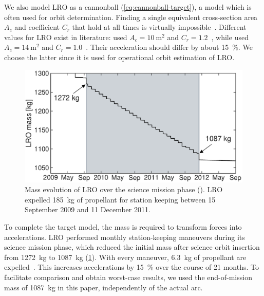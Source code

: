 We also model \gls{LRO} as a cannonball (\cref{eq:cannonball-target}), a model which is often used for orbit determination. Finding a single equivalent cross-section area $A_c$ and coefficient $C_r$ that hold at all times is virtually impossible~\cite{Vallado2013}. Different values for \gls{LRO} exist in literature: \citeauthor{Bauer2016} used $A_c = \qty{10}{\m\squared}$ and $C_r = 1.2$~\cite{Bauer2016}, while \citeauthor{Nicholson2010} used $A_c=\qty{14}{\m\squared}$ and $C_r = 1.0$~\cite{Nicholson2010}. Their acceleration should differ by about \qty{15}{\percent}. We choose the latter since it is used for operational orbit estimation of \gls{LRO}.

\begin{figure}[t]
    \centering
    \includegraphics[width=\linewidth]{figures/plots/mass_history.pdf}
    \caption{Mass evolution of \gls{LRO} over the science mission phase (\textcolor[RGB]{206, 211, 217}{}). \gls{LRO} expelled \qty{185}{\kg} of propellant for station keeping between 15 September 2009 and 11 December 2011.}
    \label{fig:mass-history}
\end{figure}

To complete the target model, the mass is required to transform forces into accelerations. \gls{LRO} performed monthly station-keeping maneuvers during its science mission phase, which reduced the initial mass after science orbit insertion from \qty{1272}{kg} to \qty{1087}{kg} (\cref{fig:mass-history}). With every maneuver, \qty{6.3}{kg} of propellant are expelled~\cite{Mesarch2010}. This increases accelerations by \qty{15}{\percent} over the course of 21 months. To facilitate comparison and obtain worst-case results, we used the end-of-mission mass of \qty{1087}{kg} in this paper, independently of the actual arc.





